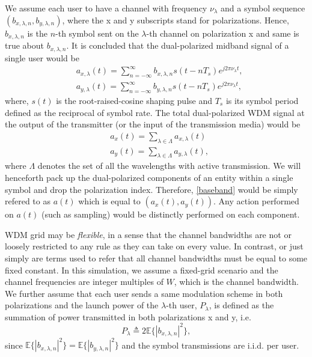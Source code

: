 \documentclass[10pt,letterpaper]{article}
\begin{document}
We assume each user to have a channel with frequency $\nu_\lambda$ and a symbol sequence $(b_{x,\lambda,n},b_{y,\lambda,n})$, where the x and y subscripts stand for polarizations. Hence, $b_{x,\lambda,n}$ is the $n$-th symbol sent on the $\lambda$-th channel on polarization x and same is true about $b_{x,\lambda,n}$. It is concluded that the dual-polarized midband signal of a single user would be
\begin{equation}\begin{split}
&
a_{x,\lambda}(t)=\sum_{n=-\infty}^\infty b_{x,\lambda,n}s(t-nT_s) e^{j2\pi \nu_\lambda t},
\\&
a_{y,\lambda}(t)=\sum_{n=-\infty}^\infty b_{y,\lambda,n}s(t-nT_s) e^{j2\pi \nu_\lambda t},
\end{split}\end{equation}
where, $s(t)$ is the root-raised-cosine shaping pulse and $T_s$ is its symbol period defined as the reciprocal of symbol rate. The total dual-polarized WDM signal at the output of the transmitter (or the input of the transmission media) would be
\begin{equation}\begin{split}
&
a_x(t)=\sum_{\lambda\in\Lambda}a_{x,\lambda}(t)
\\&
a_y(t)=\sum_{\lambda\in\Lambda}a_{y,\lambda}(t)
,
\label{baseband}
\end{split}\end{equation}
where $\Lambda$ denotes the set of all the wavelengths with active transmission. We will henceforth pack up the dual-polarized components of an entity within a single symbol and drop the polarization index. Therefore, \eqref{baseband} would be simply refered to as $a(t)$ which is equal to $(a_x(t),a_y(t))$. Any action performed on $a(t)$ (such as sampling) would be distinctly performed on each component.

WDM grid may be \textit{flexible}, in a sense that the channel bandwidths are not or loosely restricted to any rule as they can take on every value. In contrast,  or just simply  are terms used to refer that all channel bandwidths must be equal to some fixed constant. In this simulation, we assume a fixed-grid scenario and the channel frequencies are integer multiples of $W$, which is the channel bandwidth. We further assume that each user sends a same modulation scheme in both polarizations and the launch power of the $\lambda$-th user, $P_\lambda$, is defined as the summation of power transmitted in both polarizations x and y, i.e.
$$
P_\lambda\triangleq2\mathbb{E}\{|b_{x,\lambda,n}|^2\},
$$
since $\mathbb{E}\{|b_{x,\lambda,n}|^2\}=\mathbb{E}\{|b_{y,\lambda,n}|^2\}$ and the symbol transmissions are i.i.d. per user.
\end{document}
